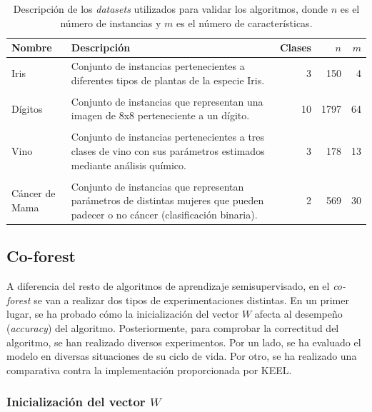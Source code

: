 \begin{table}
	\small
	\begin{centering}
		\begin{tabular}{@{}p{4em} p{20em} r r r @{}}
			\toprule
			\textbf{Nombre} & \textbf{Descripción} & \textbf{Clases} & $n$ & $m$\\ 
			\midrule
			
			Iris & Conjunto de instancias pertenecientes a diferentes tipos de plantas de la especie Iris. & 3 & 150 & 4 \\\\
			Dígitos & Conjunto de instancias que representan una imagen de 8x8 perteneciente a un dígito. & 10 & 1797 & 64 \\\\
			Vino & Conjunto de instancias pertenecientes a tres clases de vino con sus parámetros estimados mediante análisis químico. & 3 & 178 & 13 \\\\
			Cáncer de Mama & Conjunto de instancias que representan parámetros de distintas mujeres que pueden padecer o no cáncer (clasificación binaria). & 2 & 569 & 30 \\
			\bottomrule
		\end{tabular}
	\end{centering}
	\caption[Experimentación: \textit{datasets} estándar]{Descripción de los \textit{datasets} utilizados para validar los algoritmos, donde $n$ es el número de instancias y $m$ es el número de características.}
	\label{tabla_datasets_sklearn}	
\end{table}



\subsection{Co-forest}
\label{coforest-exp}
A diferencia del resto de algoritmos de aprendizaje semisupervisado, en el \textit{co-forest} se van a realizar dos tipos de experimentaciones distintas. En un primer lugar, se ha probado cómo la inicialización del vector $W$ afecta al desempeño (\textit{accuracy}) del algoritmo. Posteriormente, para comprobar la correctitud del algoritmo, se han realizado diversos experimentos. Por un lado, se ha evaluado el modelo en diversas situaciones de su ciclo de vida. Por otro, se ha realizado una comparativa contra la implementación proporcionada por KEEL.


\subsubsection{Inicialización del vector $W$}
\label{s-experimentacion-w-cof}

